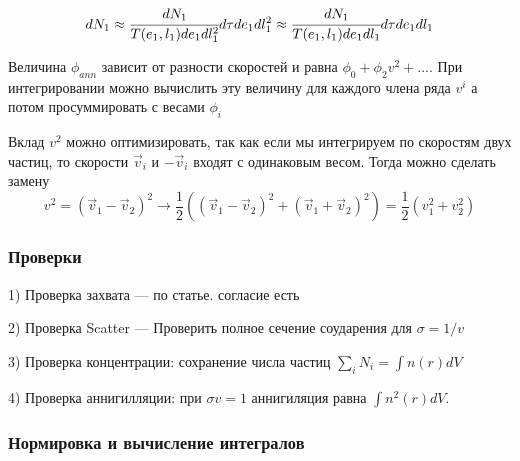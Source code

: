 \documentclass[a4paper, 14pt]{article}
\begin{document}
	\begin{equation}
		dN_1 \approx \cfrac{dN_1}{T(e_1,l_1)de_1 dl_1^2} d\tau de_1 dl_1^2 \approx \cfrac{dN_1}{T(e_1,l_1)de_1 dl_1} d\tau de_1 dl_1 
	\end{equation}
	
	Величина $\phi_{ann}$ зависит от разности скоростей и равна $\phi_0 + \phi_2 v^2 +...$. При интегрировании можно вычислить эту величину для каждого члена ряда $v^i$ а потом просуммировать с весами $\phi_i$
	
	Вклад $v^2$ можно оптимизировать, так как если мы интегрируем по скоростям двух частиц, то скорости $\vec{v}_i$ и $-\vec{v}_i$ входят с одинаковым весом. Тогда можно сделать замену
	\begin{equation}
		v^2 = (\vec{v}_1-\vec{v}_2)^2 \rightarrow \frac{1}{2}\left(
			(\vec{v}_1-\vec{v}_2)^2 + 
			(\vec{v}_1+\vec{v}_2)^2
		\right) = \frac{1}{2}(v_1^2+v_2^2)
	\end{equation}
	
	\subsubsection{Проверки}
	1) Проверка захвата --- по статье. согласие есть
	
	2) Проверка Scatter --- Проверить полное сечение соударения для $\sigma = 1/v$
	
	3) Проверка концентрации: сохранение числа частиц $\sum_i{N_i} = \int{n(r)dV}$
	
	4) Проверка аннигилляции: при $\sigma v = 1$ аннигиляция равна $\int{n^2(r)dV}$.
	
	
	\subsubsection{Нормировка  и вычисление интегралов}
	
\end{document}
